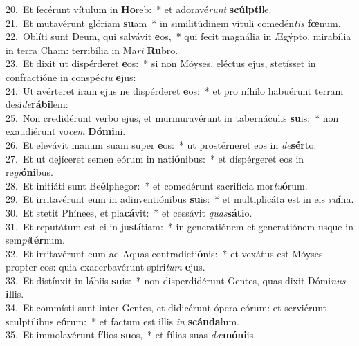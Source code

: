 {20.~}Et fecérunt vítulum in \textbf{Ho}reb:~* et adoravé\textit{runt} \textbf{scúl}\textbf{pti}le.\\
{21.~}Et mutavérunt glóriam \textbf{su}am~* in similitúdinem vítuli comedén\textit{tis} \textbf{fœ}num.\\
{22.~}Oblíti sunt Deum, qui salvávit \textbf{e}os,~* qui fecit magnália in Ægýpto, mirabília in terra Cham: terribília in Ma\textit{ri} \textbf{Ru}bro.\\
{23.~}Et dixit ut dispérderet \textbf{e}os:~* si non Móyses, eléctus ejus, stetísset in confractióne in conspé\textit{ctu} \textbf{e}jus:\\
{24.~}Ut avérteret iram ejus ne dispérderet \textbf{e}os:~* et pro níhilo habuérunt terram desi\textit{de}\textbf{rá}\textbf{bi}lem:\\
{25.~}Non credidérunt verbo ejus, et murmuravérunt in tabernáculis \textbf{su}is:~* non exaudiérunt vo\textit{cem} \textbf{Dó}\textbf{mi}ni.\\
{26.~}Et elevávit manum suam super \textbf{e}os:~* ut prostérneret eos in \textit{de}\textbf{sér}to:\\
{27.~}Et ut dejíceret semen eórum in nati\textbf{ó}nibus:~* et dispérgeret eos in re\textit{gi}\textbf{ó}\textbf{ni}bus.\\
{28.~}Et initiáti sunt Be\textbf{él}phegor:~* et comedérunt sacrifícia mor\textit{tu}\textbf{ó}rum.\\
{29.~}Et irritavérunt eum in adinventiónibus \textbf{su}is:~* et multiplicáta est in eis \textit{ru}\textbf{í}na.\\
{30.~}Et stetit Phínees, et pla\textbf{cá}vit:~* et cessávit \textit{quas}\textbf{sá}\textbf{ti}o.\\
{31.~}Et reputátum est ei in ju\textbf{stí}tiam:~* in generatiónem et generatiónem usque in sem\textit{pi}\textbf{tér}num.\\
{32.~}Et irritavérunt eum ad Aquas contradicti\textbf{ó}nis:~* et vexátus est Móyses propter eos: quia exacerbavérunt spíri\textit{tum} \textbf{e}jus.\\
{33.~}Et distínxit in lábiis \textbf{su}is:~* non disperdidérunt Gentes, quas dixit Dómi\textit{nus} \textbf{il}lis.\\
{34.~}Et commísti sunt inter Gentes, et didicérunt ópera eórum: et serviérunt sculptílibus e\textbf{ó}rum:~* et factum est illis \textit{in} \textbf{scán}\textbf{da}lum.\\
{35.~}Et immolavérunt fílios \textbf{su}os,~* et fílias suas \textit{dæ}\textbf{mó}\textbf{ni}is.\\
